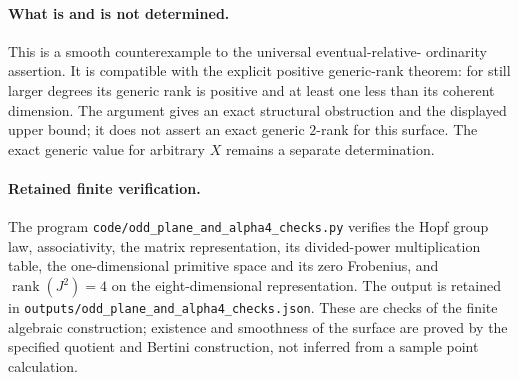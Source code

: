 \paragraph{What is and is not determined.}
This is a smooth counterexample to the universal eventual-relative-
ordinarity assertion.  It is compatible with the explicit positive
generic-rank theorem: for still larger degrees its generic rank is
positive and at least one less than its coherent dimension.  The
argument gives an exact structural obstruction and the displayed
upper bound; it does not assert an exact generic $2$-rank for this
surface.  The exact generic value for arbitrary $X$ remains a
separate determination.

\paragraph{Retained finite verification.}
The program \texttt{code/odd\_plane\_and\_alpha4\_checks.py} verifies
the Hopf group law, associativity, the matrix representation, its
divided-power multiplication table, the one-dimensional primitive
space and its zero Frobenius, and $\operatorname{rank}(J^2)=4$ on
the eight-dimensional representation.  The output is retained in
\texttt{outputs/odd\_plane\_and\_alpha4\_checks.json}.  These are
checks of the finite algebraic construction; existence and
smoothness of the surface are proved by the specified quotient and
Bertini construction, not inferred from a sample point calculation.
